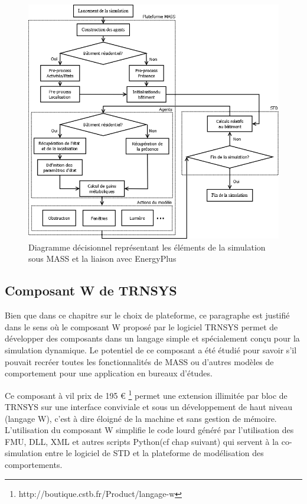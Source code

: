 \begin{figure}[H]
\centering
\includegraphics[scale=0.4]{Images/diagrammes_SMA/MASS}
\caption{Diagramme décisionnel représentant les éléments de la simulation sous MASS et la liaison avec EnergyPlus}
\label{fig:Diagramme_MASS}
\end{figure}

\subsection{Composant W de TRNSYS}

Bien que dans ce chapitre sur le choix de plateforme, ce paragraphe est justifié dans le sens où le composant W proposé par le logiciel TRNSYS permet de développer des composants dans un langage simple et spécialement conçu pour la simulation dynamique. Le potentiel de ce composant a été étudié pour savoir s'il pouvait recréer toutes les fonctionnalités de MASS ou d'autres modèles de comportement pour une application en bureaux d'études.

Ce composant à vil prix de 195 \euro{} \footnote{http://boutique.cstb.fr/Product/langage-w} permet une extension illimitée par bloc de TRNSYS sur une interface conviviale et sous un développement de haut niveau (langage W), c'est à dire éloigné de la machine et sans gestion de mémoire. L'utilisation du composant W simplifie le code lourd généré par l'utilisation des FMU, DLL, XML et autres scripts Python(cf chap suivant) qui servent à la co-simulation entre le logiciel de STD et la plateforme de modélisation des comportements.

